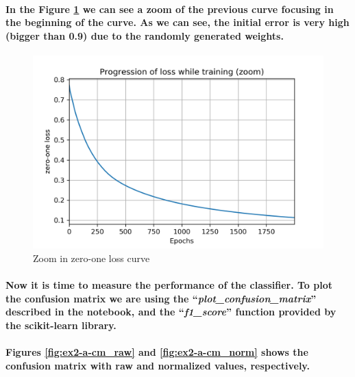 \documentclass[a4paper]{article}    %
\begin{document}
\paragraph{In the Figure \ref{fig:ex2-a-zero_one_loss_zoom} we can see a zoom of the previous curve focusing in the beginning of the curve. As we can see, the initial error is very high (bigger than 0.9) due to the randomly generated weights.}

\begin{figure}[H]
    \centering
    \includegraphics[width=12cm]{zero_one_loss_zoom}
    \caption{Zoom in zero-one loss curve}
    \label{fig:ex2-a-zero_one_loss_zoom}
\end{figure}

\paragraph{Now it is time to measure the performance of the classifier. To plot the confusion matrix we are using the ``\textit{plot\_confusion\_matrix}'' described in the notebook, and the ``\textit{f1\_score}'' function provided by the scikit-learn library.}

\paragraph{Figures \ref{fig:ex2-a-cm_raw} and \ref{fig:ex2-a-cm_norm} shows the confusion matrix with raw and normalized values, respectively.}
\end{document}
